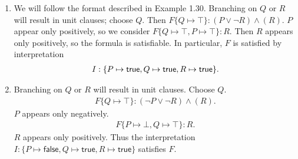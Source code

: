 \begin{exer}[1.8]
    $ $
    \begin{enumerate}[label=(\alph*)]
        \item
            We will follow the format described in Example 1.30.
            Branching on $Q$ or $R$ will result in unit clauses; choose $Q$.
            Then $F\{ Q \mapsto \top \}: (P \lor \neg R) \land (R)$.
            $P$ appear only positively, so we consider $F\{ Q \mapsto \top, P \mapsto \top \}: R$.
            Then $R$ appears only positively, so the formula is satisfiable.
            In particular, $F$ is satisfied by interpretation
            \begin{align*}
                I: \{ P \mapsto \operatorname{\textsf{true}}, Q \mapsto \operatorname{\textsf{true}}, R \mapsto \operatorname{\textsf{true}} \}.
            \end{align*}
        \item
            Branching on $Q$ or $R$ will result in unit clauses.
            Choose $Q$.
            \begin{align*}
                F\{ Q \mapsto \top \}: (\neg P \lor \neg R) \land (R).
            \end{align*}
            $P$ appears only negatively.
            \begin{align*}
                F\{ P \mapsto \bot, Q \mapsto \top \}: R.
            \end{align*}
            $R$ appears only positively.
            Thus the interpretation $I: \{ P \mapsto \textsf{false}, Q \mapsto \textsf{true}, R \mapsto \textsf{true} \}$ satisfies $F$.
    \end{enumerate}
\end{exer}

